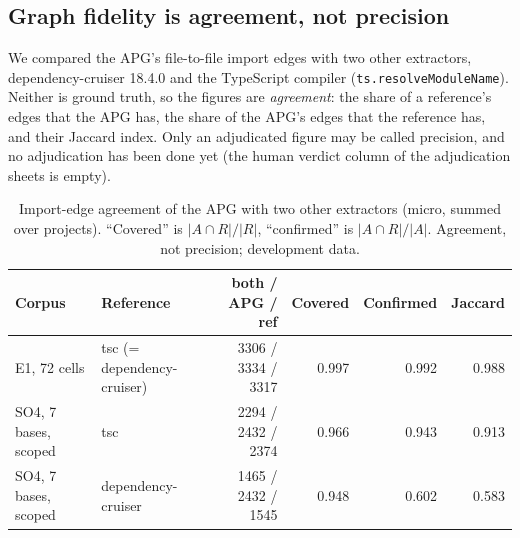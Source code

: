 \documentclass[10pt,a4paper]{article}
\newcommand{\dc}{dependency-cruiser}
\begin{document}
\subsection{Graph fidelity is agreement, not precision}\label{sec:v13-fidelity}

We compared the APG's file-to-file import edges with two other extractors, \dc{} 18.4.0 and the TypeScript compiler
(\texttt{ts.resolveModuleName}). Neither is ground truth, so the figures are \emph{agreement}: the share of a
reference's edges that the APG has, the share of the APG's edges that the reference has, and their Jaccard index.
Only an adjudicated figure may be called precision, and no adjudication has been done yet (the human verdict column
of the adjudication sheets is empty). %

\begin{table}[t]
\centering\small
\caption{Import-edge agreement of the APG with two other extractors (micro, summed over projects). ``Covered'' is
$|A\cap R|/|R|$, ``confirmed'' is $|A\cap R|/|A|$. Agreement, not precision; development data.}
\label{tab:v13-fidelity}
\begin{tabular}{llrrrr}
\toprule
Corpus & Reference & both / APG / ref & Covered & Confirmed & Jaccard \\
\midrule
E1, 72 cells & tsc (= \dc{}) & 3306 / 3334 / 3317 & 0.997 & 0.992 & 0.988 \\
SO4, 7 bases, scoped & tsc & 2294 / 2432 / 2374 & 0.966 & 0.943 & 0.913 \\
SO4, 7 bases, scoped & \dc{} & 1465 / 2432 / 1545 & 0.948 & 0.602 & 0.583 \\
\bottomrule
\end{tabular}
\end{table}
\end{document}
